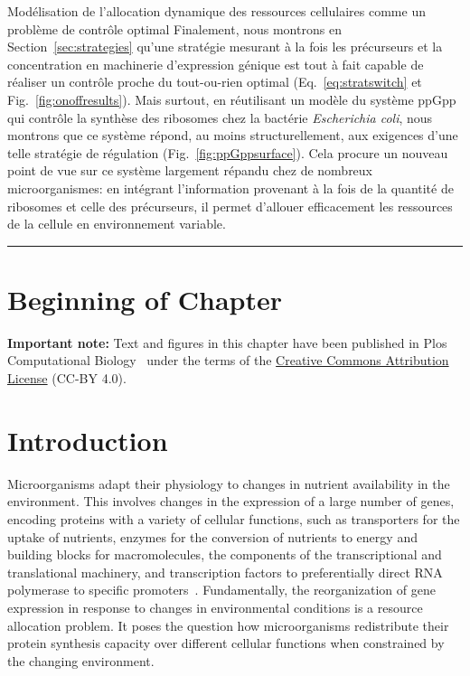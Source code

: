 \begin{chapter_summary}{Modélisation de l'allocation dynamique des ressources cellulaires comme un problème de contrôle optimal}
Finalement, nous montrons en Section~\ref{sec:strategies} qu'une stratégie mesurant à la fois les précurseurs et la concentration en machinerie d'expression génique est tout à fait capable de réaliser un contrôle proche du tout-ou-rien optimal (Eq.~\ref{eq:stratswitch} et Fig.~\ref{fig:onoffresults}).
Mais surtout, en réutilisant un modèle du système ppGpp qui contrôle la synthèse des ribosomes chez la bactérie \textit{Escherichia coli}, nous montrons que ce système répond, au moins structurellement, aux exigences d'une telle stratégie de régulation (Fig.~\ref{fig:ppGppsurface}).
Cela procure un nouveau point de vue sur ce système largement répandu chez de nombreux microorganismes: en intégrant l'information provenant à la fois de la quantité de ribosomes et celle des précurseurs, il permet d'allouer efficacement les ressources de la cellule en environnement variable.
\end{chapter_summary}

\begin{center}
\noindent\rule{4cm}{0.1pt}
\end{center}

\section*{Beginning of Chapter \thechapter}

\noindent \textbf{Important note:} Text and figures in this chapter have been published in Plos Computational Biology~\cite{giordano_dynamical_2016} under the terms of the \href{https://creativecommons.org/licenses/by/4.0/}{Creative Commons Attribution License} (CC-BY 4.0).

\section{Introduction}

Microorganisms adapt their physiology to changes in nutrient availability in the environment.
This involves changes in the expression of a large number of genes, encoding proteins with a variety of cellular functions, such as transporters for the uptake of nutrients, enzymes for the conversion of nutrients to energy and building blocks for macromolecules, the components of the transcriptional and translational machinery, and transcription factors to preferentially direct RNA polymerase to specific promoters~\cite{schaechter_microbe_2006,keseler_ecocyc_2013}.
Fundamentally, the reorganization of gene expression in response to changes in environmental conditions is a resource allocation problem.
It poses the question how microorganisms redistribute their protein synthesis capacity over different cellular functions when constrained by the changing environment.

